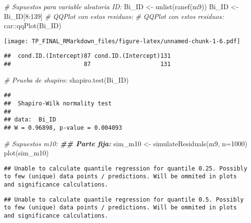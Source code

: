 \documentclass[
]{article}
\newenvironment{Shaded}{\begin{snugshade}}{\end{snugshade}}
\newcommand{\AttributeTok}[1]{\textcolor[rgb]{0.77,0.63,0.00}{#1}}
\newcommand{\CommentTok}[1]{\textcolor[rgb]{0.56,0.35,0.01}{\textit{#1}}}
\newcommand{\DecValTok}[1]{\textcolor[rgb]{0.00,0.00,0.81}{#1}}
\newcommand{\DocumentationTok}[1]{\textcolor[rgb]{0.56,0.35,0.01}{\textbf{\textit{#1}}}}
\newcommand{\FunctionTok}[1]{\textcolor[rgb]{0.00,0.00,0.00}{#1}}
\newcommand{\NormalTok}[1]{#1}
\newcommand{\OtherTok}[1]{\textcolor[rgb]{0.56,0.35,0.01}{#1}}
\newcommand{\SpecialCharTok}[1]{\textcolor[rgb]{0.00,0.00,0.00}{#1}}
\begin{document}
\begin{Shaded}
\begin{Highlighting}[]
\CommentTok{\# Supuestos para variable aleatoria ID:}
\NormalTok{Bi\_ID }\OtherTok{\textless{}{-}} \FunctionTok{unlist}\NormalTok{(}\FunctionTok{ranef}\NormalTok{(m9))}
\NormalTok{Bi\_ID }\OtherTok{\textless{}{-}}\NormalTok{ Bi\_ID[}\DecValTok{8}\SpecialCharTok{:}\DecValTok{139}\NormalTok{]}
\CommentTok{\# QQPlot con estos residuos:}
\CommentTok{\# QQPlot con estos residuos:}
\NormalTok{car}\SpecialCharTok{::}\FunctionTok{qqPlot}\NormalTok{(Bi\_ID)}
\end{Highlighting}
\end{Shaded}

\texttt{[image: TP\_FINAL\_RMarkdown\_files/figure-latex/unnamed-chunk-1-6.pdf]}

\begin{verbatim}
##  cond.ID.(Intercept)87 cond.ID.(Intercept)131 
##                     87                    131
\end{verbatim}

\begin{Shaded}
\begin{Highlighting}[]
\CommentTok{\# Prueba de shapiro:}
\FunctionTok{shapiro.test}\NormalTok{(Bi\_ID)}
\end{Highlighting}
\end{Shaded}

\begin{verbatim}
## 
##  Shapiro-Wilk normality test
## 
## data:  Bi_ID
## W = 0.96898, p-value = 0.004093
\end{verbatim}

\begin{Shaded}
\begin{Highlighting}[]
\CommentTok{\# Supuestos m10:}
\DocumentationTok{\#\# Parte fija:}
\NormalTok{sim\_m10 }\OtherTok{\textless{}{-}} \FunctionTok{simulateResiduals}\NormalTok{(m9, }\AttributeTok{n=}\DecValTok{1000}\NormalTok{)}
\FunctionTok{plot}\NormalTok{(sim\_m10)}
\end{Highlighting}
\end{Shaded}

\begin{verbatim}
## Unable to calculate quantile regression for quantile 0.25. Possibly to few (unique) data points / predictions. Will be ommited in plots and significance calculations.
\end{verbatim}

\begin{verbatim}
## Unable to calculate quantile regression for quantile 0.5. Possibly to few (unique) data points / predictions. Will be ommited in plots and significance calculations.
\end{verbatim}
\end{document}
